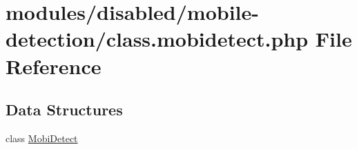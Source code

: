 \hypertarget{class_8mobidetect_8php}{\section{modules/disabled/mobile-\/detection/class.mobidetect.\-php File Reference}
\label{class_8mobidetect_8php}
}
\subsection*{Data Structures}
\begin{DoxyCompactItemize}
\item 
class \hyperlink{class_mobi_detect}{Mobi\-Detect}
\end{DoxyCompactItemize}

